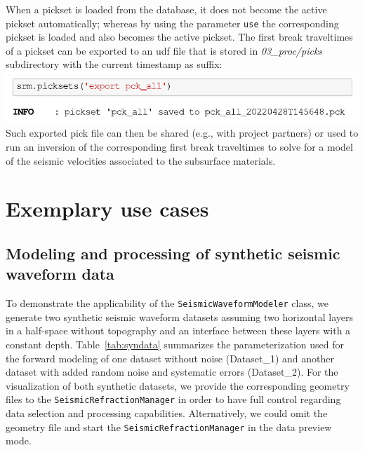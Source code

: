 \documentclass[a4paper,fleqn]{cas-sc}
\begin{document}
\newline
When a pickset is loaded from the database, it does not become the active pickset automatically; whereas by using the parameter \texttt{use} the corresponding pickset is loaded and also becomes the active pickset. The first break traveltimes of a pickset can be exported to an udf file that is stored in \textit{03\_proc/picks} subdirectory with the current timestamp as suffix:
\newline
\includegraphics[width=.5\textwidth]{./figures/export_pickset.pdf}
\newline
Such exported pick file can then be shared (e.g., with project partners) or used to run an inversion of the corresponding first break traveltimes to solve for a model of the seismic velocities associated to the subsurface materials.

\section{Exemplary use cases}

\subsection{Modeling and processing of synthetic seismic waveform data}

To demonstrate the applicability of the \texttt{SeismicWaveformModeler} class, we generate two synthetic seismic waveform datasets assuming two horizontal layers in a half-space without topography and an interface between these layers with a constant depth.
Table~\ref{tab:syndata} summarizes the parameterization used for the forward modeling of one dataset without noise (Dataset\_1) and another dataset with added random noise and systematic errors (Dataset\_2).
For the visualization of both synthetic datasets, we provide the corresponding geometry files to the \texttt{SeismicRefractionManager} in order to have full control regarding data selection and processing capabilities. Alternatively, we could omit the geometry file and start the \texttt{SeismicRefractionManager} in the data preview mode.
\end{document}
